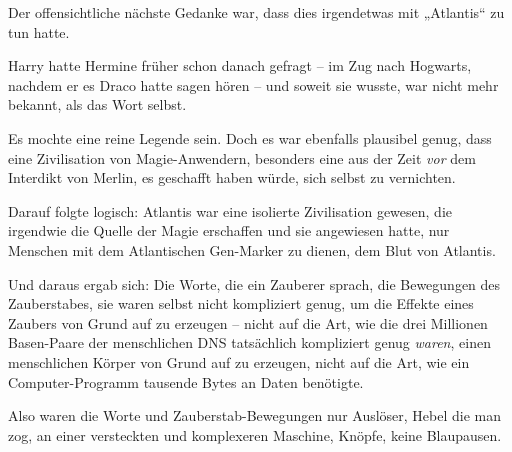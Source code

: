 Der offensichtliche nächste Gedanke war, dass dies irgendetwas mit „Atlantis“ zu tun hatte.

Harry hatte Hermine früher schon danach gefragt -- im Zug nach Hogwarts, nachdem er es Draco hatte sagen hören -- und soweit sie wusste, war nicht mehr bekannt, als das Wort selbst.

Es mochte eine reine Legende sein. Doch es war ebenfalls plausibel genug, dass eine Zivilisation von Magie-Anwendern, besonders eine aus der Zeit \emph{vor} dem Interdikt von Merlin, es geschafft haben würde, sich selbst zu vernichten.

Darauf folgte logisch: Atlantis war eine isolierte Zivilisation gewesen, die irgendwie die Quelle der Magie erschaffen und sie angewiesen hatte, nur Menschen mit dem Atlantischen Gen-Marker zu dienen, dem Blut von Atlantis.

Und daraus ergab sich: Die Worte, die ein Zauberer sprach, die Bewegungen des Zauberstabes, sie waren selbst nicht kompliziert genug, um die Effekte eines Zaubers von Grund auf zu erzeugen -- nicht auf die Art, wie die drei Millionen Basen-Paare der menschlichen DNS tatsächlich kompliziert genug \emph{waren}, einen menschlichen Körper von Grund auf zu erzeugen, nicht auf die Art, wie ein Computer-Programm tausende Bytes an Daten benötigte.

Also waren die Worte und Zauberstab-Bewegungen nur Auslöser, Hebel die man zog, an einer versteckten und komplexeren Maschine, Knöpfe, keine Blaupausen.

